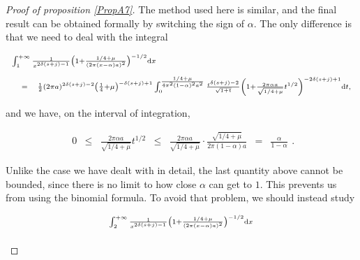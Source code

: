 \documentclass{jams-l}
\theoremstyle{definition}
\theoremstyle{remark}
\numberwithin{equation}{section}
\begin{document}
\begin{proof}[Proof of proposition \ref{PropA7}]
                    \noindent The method used here is similar, and the final result can be obtained formally by switching the sign of $\alpha$. The only difference is that we need to deal with the integral
                    
                    \[ \begin{array}{lll}
                            \multicolumn{3}{l}{\scriptstyle \int_1^{+ \infty} \frac{1}{x^{2 \delta \left( s + j \right) - 1}} \left( 1 + \frac{1/4 + \mu}{\left( 2 \pi \left( x - \alpha \right) a \right)^2} \right)^{-1/2} \mathrm{d}x} \\[1em]
                        
                            & \scriptstyle = & \scriptstyle \frac{1}{2} \left( 2 \pi a \right)^{2 \delta \left( s + j \right) - 2} \left( \frac{1}{4} + \mu \right)^{- \delta \left( s + j \right) + 1} \int_0^{\frac{1/4 + \mu}{4 \pi^2 \left( 1 - \alpha \right)^2 a^2}} \frac{t^{\delta \left( s + j \right) - 2}}{\sqrt{1 + t}} \left( 1 + \frac{2 \pi \alpha a}{\sqrt{1/4 + \mu}} t^{1/2} \right)^{- 2 \delta \left( s + j \right) + 1} \mathrm{d}t,
                        \end{array} \]
                    
                    \noindent and we have, on the interval of integration,
                    
                    \[ \begin{array}{lllllll}
                            0 & \leqslant & \frac{2 \pi \alpha a}{\sqrt{1/4 + \mu}} t^{1/2} & \leqslant & \frac{2 \pi \alpha a}{\sqrt{1/4 + \mu}} \cdot \frac{\sqrt{1/4 + \mu}}{2 \pi \left( 1 - \alpha \right) a} & = & \frac{\alpha}{1 - \alpha}
                        \end{array} . \]
                    
                    \noindent Unlike the case we have dealt with in detail, the last quantity above cannot be bounded, since there is no limit to how close $\alpha$ can get to $1$. This prevents us from using the binomial formula. To avoid that problem, we should instead study
                    
                    \[ \begin{array}{lll}
                            \multicolumn{3}{l}{\scriptstyle \int_2^{+ \infty} \frac{1}{x^{2 \delta \left( s + j \right) - 1}} \left( 1 + \frac{1/4 + \mu}{\left( 2 \pi \left( x - \alpha \right) a \right)^2} \right)^{-1/2} \mathrm{d}x} \\[1em]
                        

\end{array}\]
\end{proof}
\end{document}
